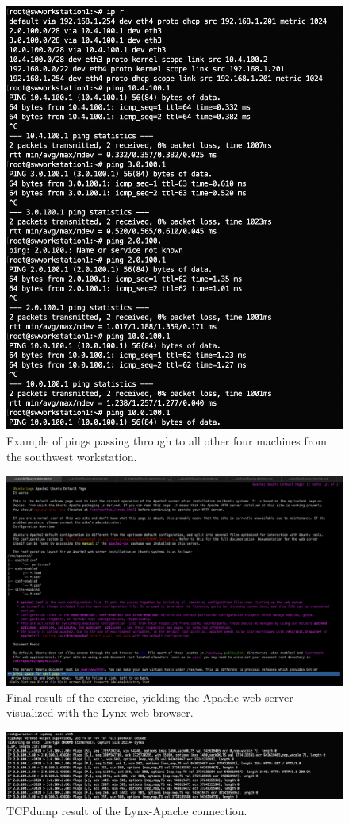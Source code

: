 \documentclass[a4paper,11pt,hidelinks]{article}
\begin{document}
\begin{figure}
  \centering
  \includegraphics[width=\textwidth]{drawable/ping-result.png}
  \caption{Example of pings passing through to all other four machines from the southwest workstation.}
\end{figure}

\begin{figure}
  \centering
  \includegraphics[width=\textwidth]{drawable/lynx-result.png}
  \caption{Final result of the exercise, yielding the Apache web server visualized with the Lynx web browser.}
\end{figure}

\begin{figure}
  \centering
  \includegraphics[width=\textwidth]{drawable/tcpdump-nat-result.png}
  \caption{TCPdump result of the Lynx-Apache connection.}
\end{figure}

\endgroup
\end{document}
